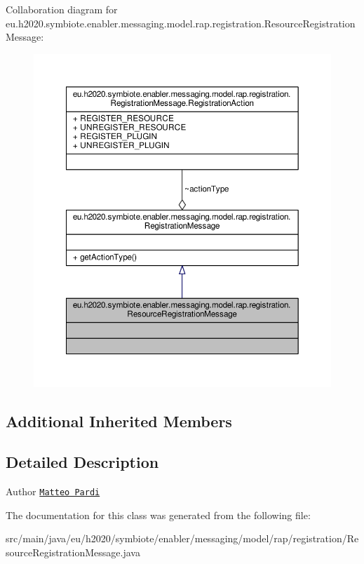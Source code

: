 Collaboration diagram for eu.\+h2020.\+symbiote.\+enabler.\+messaging.\+model.\+rap.\+registration.\+Resource\+Registration\+Message\+:
\nopagebreak
\begin{figure}[H]
\begin{center}
\leavevmode
\includegraphics[width=350pt]{classeu_1_1h2020_1_1symbiote_1_1enabler_1_1messaging_1_1model_1_1rap_1_1registration_1_1Resource8d835040b76680364542058b99025bb4}
\end{center}
\end{figure}
\subsection*{Additional Inherited Members}


\subsection{Detailed Description}
\begin{DoxyAuthor}{Author}
\href{mailto:m.pardi@nextworks.it}{\tt Matteo Pardi} 
\end{DoxyAuthor}


The documentation for this class was generated from the following file\+:\begin{DoxyCompactItemize}
\item 
src/main/java/eu/h2020/symbiote/enabler/messaging/model/rap/registration/Resource\+Registration\+Message.\+java\end{DoxyCompactItemize}

